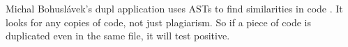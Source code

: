 \documentclass[12pt]{article}
\begin{document}
				Michal Bohuslávek's dupl application uses ASTs to find similarities in code \cite{bohuslave}. It looks for any copies of code, not just plagiarism. So if a piece of code is duplicated even in the same file, it will test positive.
			
				\begin{figure}
					\begin{floatrow}
							
					\end{floatrow}
				\end{figure}
		
		\subsec
\end{document}
